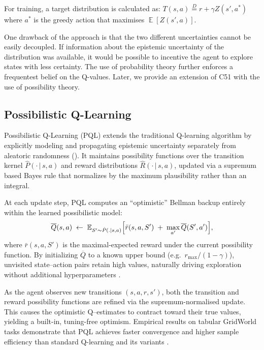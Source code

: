 \documentclass[11pt,a4paper]{report}
\DeclareMathOperator{\EX}{\mathbb{E}}
\begin{document}
\par
For training, a target distribution is calculated as: \(T(s,a) \overset{D}{=} r + \gamma Z(s', a^*)\) where $a^*$ is the greedy action that maximises $\EX[Z(s', a)]$. \par


One drawback of the approach is that the two different uncertainties cannot be easily decoupled. If information about the epistemic uncertainty of the distribution was available, it would be possible to incentive the agent to explore states with less certainty. The use of probability theory further enforces a frequentest belief on the Q-values. Later, we provide an extension of C51 with the use of possibility theory.  


\subsection{Possibilistic Q-Learning}

Possibilistic Q-Learning (PQL) extends the traditional Q-learning algorithm by explicitly modeling and propagating epistemic uncertainty separately from aleatoric randomness (\cite{thomas2025}). It maintains possibility functions over the transition kernel $\hat{P}(\cdot\,|\,s,a)$ and reward distributions $\hat{R}(\cdot\,|\,s,a)$, updated via a supremum based Bayes rule that normalizes by the maximum plausibility rather than an integral.

At each update step, PQL computes an “optimistic” Bellman backup entirely within the learned possibilistic model:
\[
  \overline{Q}(s,a)\;\leftarrow\;\mathbb{E}_{S'\sim \hat P(. \mid s,a)}\Bigl[\bar r(s,a,S') \;+\;\max_{a'}\overline{Q}(S',a')\Bigr],
\]
where $\bar r(s,a,S')$ is the maximal‐expected reward under the current possibility function. By initializing $\overline{Q}$ to a known upper bound (e.g.\ $r_{\max}/(1-\gamma)$), unvisited state–action pairs retain high values, naturally driving exploration without additional hyperparameters \cite{thomas2025}.

As the agent observes new transitions $(s,a,r,s')$, both the transition and reward possibility functions are refined via the supremum-normalised update. This causes the optimistic Q–estimates to contract toward their true values, yielding a built-in, tuning-free optimism. Empirical results on tabular GridWorld tasks demonstrate that PQL achieves faster convergence and higher sample efficiency than standard Q-learning and its variants \cite{thomas2025}.
\end{document}
